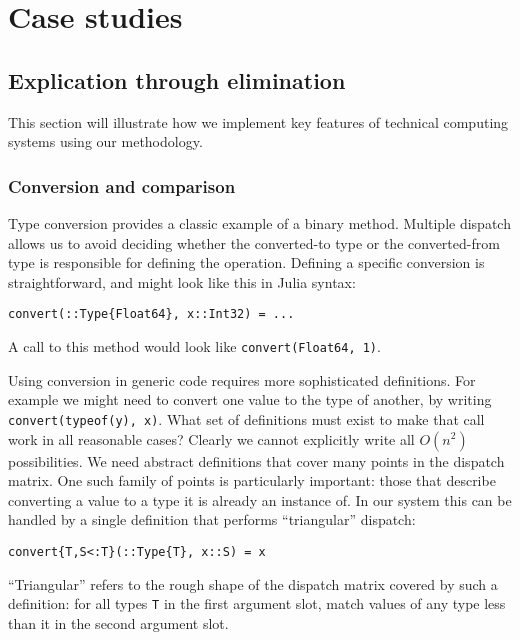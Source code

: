 \chapter{Case studies}

\section{Explication through elimination}

This section will illustrate how we implement key features of technical computing
systems using our methodology.

\subsection{Conversion and comparison}

Type conversion provides a classic example of a binary method. Multiple
dispatch allows us to avoid deciding whether the converted-to type or the
converted-from type is responsible for defining the operation.
Defining a specific conversion is straightforward, and might look like this
in Julia syntax:

\begin{verbatim}
convert(::Type{Float64}, x::Int32) = ...
\end{verbatim}

\noindent
A call to this method would look like \texttt{convert(Float64, 1)}.

Using conversion in generic code requires more sophisticated definitions.
For example we might need to convert one value to the type of another,
by writing \texttt{convert(typeof(y), x)}. What set of definitions must
exist to make that call work in all reasonable cases? Clearly we cannot
explicitly write all $O(n^2)$ possibilities. We need abstract definitions
that cover many points in the dispatch matrix. One such family of points
is particularly important: those that describe converting a value to a
type it is already an instance of. In our system this can be handled by
a single definition that performs ``triangular'' dispatch:

\begin{verbatim}
convert{T,S<:T}(::Type{T}, x::S) = x
\end{verbatim}

\noindent
``Triangular'' refers to the rough shape of the dispatch matrix covered
by such a definition: for all types \texttt{T} in the first argument slot,
match values of any type less than it in the second argument slot.

